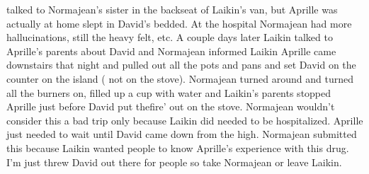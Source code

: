 \documentclass[12pt]{book}
\begin{document}
talked to Normajean's sister in the backseat of Laikin's van, but Aprille was actually at home slept in David's bedded. At the hospital Normajean had more hallucinations, still the heavy felt, etc. A couple days later Laikin talked to Aprille's parents about David and Normajean informed Laikin Aprille came downstairs that night and pulled out all the pots and pans and set David on the counter on the island ( not on the stove). Normajean turned around and turned all the burners on, filled up a cup with water and Laikin's parents stopped Aprille just before David put thefire' out on the stove. Normajean wouldn't consider this a bad trip only because Laikin did needed to be hospitalized. Aprille just needed to wait until David came down from the high. Normajean submitted this because Laikin wanted people to know Aprille's experience with this drug. I'm just threw David out there for people so take Normajean or leave Laikin.
\end{document}
